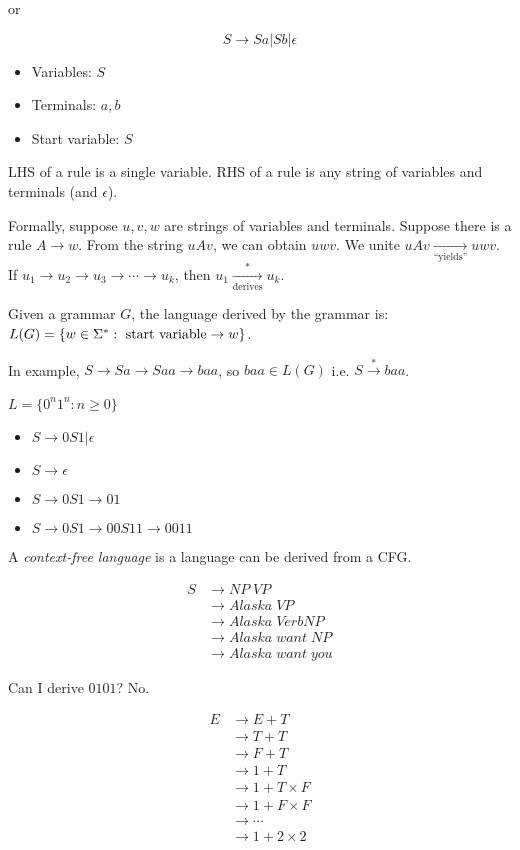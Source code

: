 or

\begin{equation*}
    S \rightarrow Sa|Sb|\epsilon
\end{equation*}

\begin{itemize}
    \item Variables: $S$
    \item Terminals: $a, b$
    \item Start variable: $S$
\end{itemize}

LHS of a rule is a single variable. RHS of a rule is any string of variables and terminals (and $\epsilon$).

Formally, suppose $u, v, w$ are strings of variables and terminals. Suppose there is a rule $A \rightarrow w$. From the string $uAv$, we can obtain $uwv$. We unite $uAv \xrightarrow[\text{``yields''}]{} uwv$. If $u_1 \rightarrow u_2 \rightarrow u_3 \rightarrow \cdots \rightarrow u_k$, then $u_1 \xrightarrow[\text{derives}]{*} u_k$.

Given a grammar $G$, the language derived by the grammar is: $L(G) = \left \{ w \in \Sigma^*: \text{ start variable} \rightarrow w \right \}$.

In example, $S \rightarrow Sa \rightarrow Saa \rightarrow baa$, so $baa \in L(G)$ i.e. $S \xrightarrow[]{*} baa$.

\begin{example}
    $L = \{0^n1^n: n \geq 0\}$

    \begin{itemize}
        \item $S \rightarrow 0S1|\epsilon$
        \item $S \rightarrow \epsilon$
        \item $S \rightarrow 0S1 \rightarrow 01$
        \item $S \rightarrow 0S1 \rightarrow 00S11 \rightarrow 0011$
    \end{itemize}
\end{example}

A \emph{context-free language} is a language can be derived from a CFG.

\begin{align*}
  S
  &\rightarrow NP \; VP \\
  &\rightarrow Alaska \; VP \\
  &\rightarrow Alaska \; Verb NP \\
  &\rightarrow Alaska \; want \; NP\\
  &\rightarrow Alaska \; want \; you
\end{align*}

Can I derive $0101$? No.

\begin{align*}
  E
  &\rightarrow E + T \\
  &\rightarrow T + T \\
  &\rightarrow F + T \\
  &\rightarrow 1 + T \\
  &\rightarrow 1 + T \times F \\
  &\rightarrow 1 + F \times F \\
  &\rightarrow \cdots \\
  &\rightarrow 1 + 2 \times 2
\end{align*}
